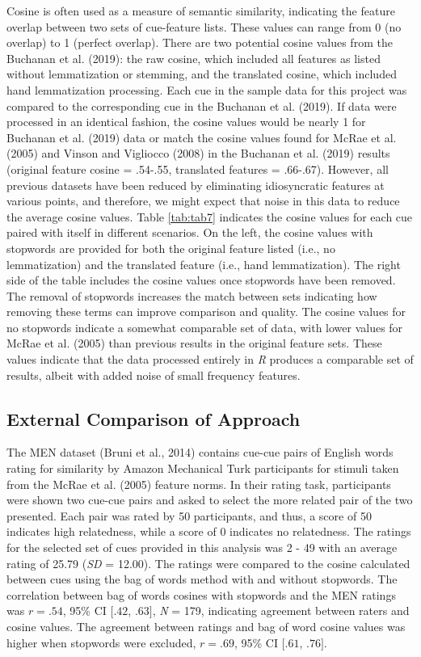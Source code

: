 \documentclass[man]{apa6}
\begin{document}
Cosine is often used as a measure of semantic similarity, indicating the feature overlap between two sets of cue-feature lists. These values can range from 0 (no overlap) to 1 (perfect overlap). There are two potential cosine values from the Buchanan et al. (2019): the raw cosine, which included all features as listed without lemmatization or stemming, and the translated cosine, which included hand lemmatization processing. Each cue in the sample data for this project was compared to the corresponding cue in the Buchanan et al. (2019). If data were processed in an identical fashion, the cosine values would be nearly 1 for Buchanan et al. (2019) data or match the cosine values found for McRae et al. (2005) and Vinson and Vigliocco (2008) in the Buchanan et al. (2019) results (original feature cosine = .54-.55, translated features = .66-.67). However, all previous datasets have been reduced by eliminating idiosyncratic features at various points, and therefore, we might expect that noise in this data to reduce the average cosine values. Table \ref{tab:tab7} indicates the cosine values for each cue paired with itself in different scenarios. On the left, the cosine values with stopwords are provided for both the original feature listed (i.e., no lemmatization) and the translated feature (i.e., hand lemmatization). The right side of the table includes the cosine values once stopwords have been removed. The removal of stopwords increases the match between sets indicating how removing these terms can improve comparison and quality. The cosine values for no stopwords indicate a somewhat comparable set of data, with lower values for McRae et al. (2005) than previous results in the original feature sets. These values indicate that the data processed entirely in \emph{R} produces a comparable set of results, albeit with added noise of small frequency features.

\hypertarget{external-comparison-of-approach}{%
\subsection{External Comparison of Approach}\label{external-comparison-of-approach}}

The MEN dataset (Bruni et al., 2014) contains cue-cue pairs of English words rating for similarity by Amazon Mechanical Turk participants for stimuli taken from the McRae et al. (2005) feature norms. In their rating task, participants were shown two cue-cue pairs and asked to select the more related pair of the two presented. Each pair was rated by 50 participants, and thus, a score of 50 indicates high relatedness, while a score of 0 indicates no relatedness. The ratings for the selected set of cues provided in this analysis was 2 - 49 with an average rating of 25.79 (\emph{SD} = 12.00). The ratings were compared to the cosine calculated between cues using the bag of words method with and without stopwords. The correlation between bag of words cosines with stopwords and the MEN ratings was \(r = .54\), 95\% CI \([.42\), \(.63]\), \emph{N} = 179, indicating agreement between raters and cosine values. The agreement between ratings and bag of word cosine values was higher when stopwords were excluded, \(r = .69\), 95\% CI \([.61\), \(.76]\).
\end{document}
